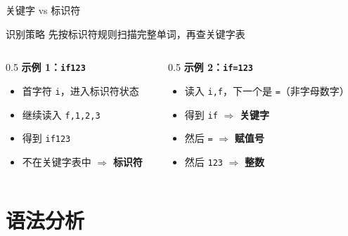 \documentclass[aspectratio=169]{ctexbeamer}
\begin{document}
\begin{frame}{关键字 vs 标识符}
    \begin{block}{识别策略}
        先按标识符规则扫描完整单词，再查关键字表
    \end{block}
    \vfill
    \begin{columns}[T]
    \begin{column}{0.5\textwidth}
        \textbf{示例 1：\texttt{if123}}
        \begin{itemize}
            \item 首字符 \texttt{i}，进入标识符状态
            \item 继续读入 \texttt{f,1,2,3}
            \item 得到 \texttt{if123}
            \item 不在关键字表中 $\Rightarrow$ \textbf{标识符}
        \end{itemize}
    \end{column}
    \begin{column}{0.5\textwidth}
        \textbf{示例 2：\texttt{if=123}}
        \begin{itemize}
            \item 读入 \texttt{i,f}，下一个是 \texttt{=}（非字母数字）
            \item 得到 \texttt{if} $\Rightarrow$ \textbf{关键字}
            \item 然后 \texttt{=} $\Rightarrow$ \textbf{赋值号}
            \item 然后 \texttt{123} $\Rightarrow$ \textbf{整数}
        \end{itemize}
    \end{column}
    \end{columns}
\end{frame}

\section{语法分析}
\end{document}
